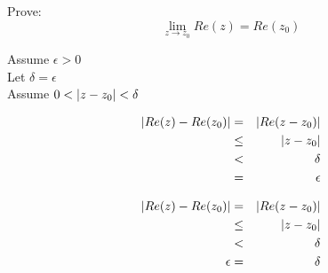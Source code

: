 \documentclass[letterpaper,12pt,fleqn]{article}
\newcommand{\e}{\epsilon}
\renewcommand{\d}{\delta}
\begin{document}
\begin{example}
  Prove:
  \[\lim_{z\to z_0}Re(z)=Re(z_0)\]

  \begin{minipage}[t]{3in}
    Assume $\e>0$ \\
    Let $\d=\e$ \\
    Assume $0<\abs{z-z_0}<\d$
    
    \begin{eqnarray*}
      \abs{Re(z)-Re(z_0)} &=& \abs{Re(z-z_0)} \\
        &\le& \abs{z-z_0} \\
        &<& \d \\
        &=& \e \\
    \end{eqnarray*}
  \end{minipage}
  \begin{minipage}[t]{3in}
    \begin{eqnarray*}
      \abs{Re(z)-Re(z_0)} &=& \abs{Re(z-z_0)} \\
        &\le& \abs{z-z_0} \\
        &<& \d \\
        \e &=& \d \\
    \end{eqnarray*}
  \end{minipage}
\end{example}
\newpage
\end{document}

